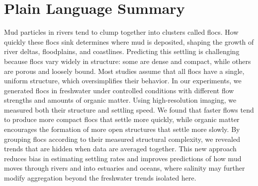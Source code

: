 \documentclass{agujournal2019}
\providecommand{\DIFadd}[1]{{\protect\color{blue}#1}}
\begin{document}
\section*{Plain Language Summary}
Mud particles in rivers tend to clump together into clusters called flocs. How quickly these flocs sink determines where mud is deposited, shaping the growth of river deltas, floodplains, and coastlines. Predicting this settling is challenging because flocs vary widely in structure: some are dense and compact, while others are porous and loosely bound. Most studies assume that all flocs have a single, uniform structure, which oversimplifies their behavior. In our experiments, we generated flocs in freshwater under controlled conditions with different flow strengths and amounts of organic matter. Using high-resolution imaging, we measured both their structure and settling speed. We found that faster flows tend to produce more compact flocs that settle more quickly, while organic matter encourages the formation of more open structures that settle more slowly. By grouping flocs according to their measured structural complexity, we revealed trends that are hidden when data are averaged together. This new approach reduces bias in estimating settling rates and improves predictions of how mud moves through rivers and into estuaries and oceans\DIFadd{, where salinity may further modify aggregation beyond the freshwater trends isolated here}.

%
%

%

\end{document}
